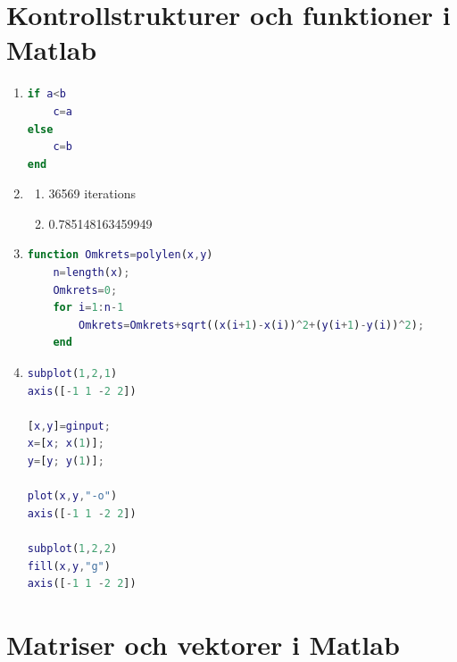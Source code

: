 \documentclass{article}
\begin{document}
\pagebreak
\section{Kontrollstrukturer och funktioner i Matlab}

\begin{enumerate}

\item
\begin{lstlisting}[language=matlab]
if a<b
    c=a
else
    c=b
end
\end{lstlisting}

\item
\begin{enumerate}
\item
36569 iterations

\item
0.785148163459949

\end{enumerate}

\item
\begin{lstlisting}[language=matlab]
function Omkrets=polylen(x,y)
    n=length(x);
    Omkrets=0;
    for i=1:n-1
        Omkrets=Omkrets+sqrt((x(i+1)-x(i))^2+(y(i+1)-y(i))^2);
    end
\end{lstlisting}

\item
\begin{lstlisting}[language=matlab]
subplot(1,2,1)
axis([-1 1 -2 2])

[x,y]=ginput;
x=[x; x(1)];
y=[y; y(1)];

plot(x,y,"-o")
axis([-1 1 -2 2])

subplot(1,2,2)
fill(x,y,"g")
axis([-1 1 -2 2])
\end{lstlisting}

\end{enumerate}

\pagebreak
\section{Matriser och vektorer i Matlab}
\end{document}
